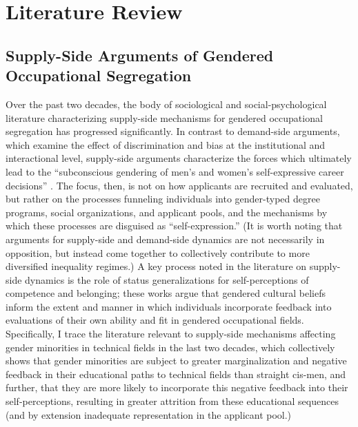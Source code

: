 \section{Literature Review}\label{sec:scholarly}

\subsection{Supply-Side Arguments of Gendered Occupational Segregation}

Over the past two decades, the body of sociological and social-psychological literature characterizing supply-side mechanisms for gendered occupational segregation has progressed significantly. In contrast to demand-side arguments, which examine the effect of discrimination and bias at the institutional and interactional level, supply-side arguments characterize the forces which ultimately lead to the ``subconscious gendering of men’s and women’s self-expressive career decisions'' \cite{cech_self-expressive_2013}. The focus, then, is not on how applicants are recruited and evaluated, but rather on the processes funneling individuals into gender-typed degree programs, social organizations, and applicant pools, and the mechanisms by which these processes are disguised as ``self-expression.'' (It is worth noting that arguments for supply-side and demand-side dynamics are not necessarily in opposition, but instead come together to collectively contribute to more diversified inequality regimes.) A key process noted in the literature on supply-side dynamics is the role of status generalizations for self-perceptions of competence and belonging; these works argue that gendered cultural beliefs inform the extent and manner in which individuals incorporate feedback into evaluations of their own ability and fit in gendered occupational fields. Specifically, I trace the literature relevant to supply-side mechanisms affecting gender minorities in technical fields in the last two decades, which collectively shows that gender minorities are subject to greater marginalization and negative feedback in their educational paths to technical fields than straight cis-men, and further, that they are more likely to incorporate this negative feedback into their self-perceptions, resulting in greater attrition from these educational sequences (and by extension inadequate representation in the applicant pool.)  
	
